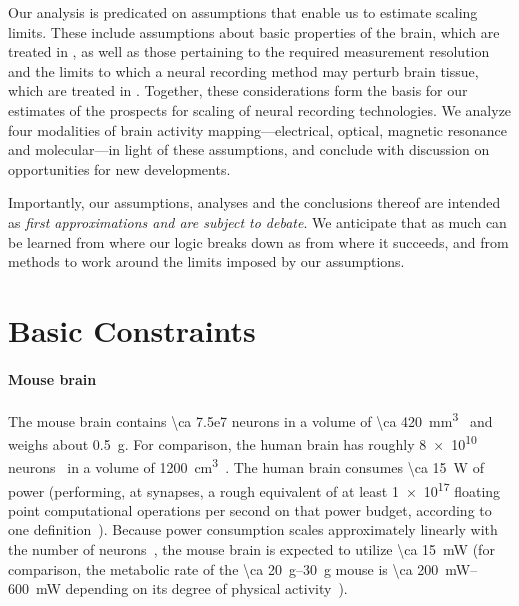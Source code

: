 Our analysis is predicated on assumptions that enable us to estimate scaling limits.
These include assumptions about basic properties of the brain, which are treated in , as well as those pertaining to the required measurement resolution and the limits to which a neural recording method may perturb brain tissue, which are treated in .
Together, these considerations form the basis for our estimates of the prospects for scaling of neural recording technologies.
We analyze four modalities of brain activity mapping---electrical, optical, magnetic resonance and molecular---in light of these assumptions, and conclude with discussion on opportunities for new developments.

Importantly, our assumptions, analyses and the conclusions thereof are intended as \emph{first approximations and are subject to debate}.
We anticipate that as much can be learned from where our logic breaks down as from where it succeeds, and from methods to work around the limits imposed by our assumptions.

\section{Basic Constraints}
\label{sec:constraints}

\paragraph{Mouse brain}
The mouse brain contains \num{\ca 7.5e7} neurons in a volume of \SI{\ca 420}{\milli\meter\cubed}~\cite{vincent10} and weighs about \SI{0.5}{\gram}.
For comparison, the human brain has roughly \num{8e10} neurons~\cite{azevedo09} in a volume of \SI{1200}{\centi\meter\cubed}~\cite{allen02}.
The human brain consumes \SI{\ca 15}{\watt} of power (performing, at synapses, a rough equivalent of at least \num{1e17} floating point computational operations per second on that power budget, according to one definition~\cite{sarpeshkar10}).
Because power consumption scales approximately linearly with the number of neurons~\cite{houzel11}, the mouse brain is expected to utilize \SI{\ca 15}{\milli\watt} (for comparison, the metabolic rate of the \SIrange{\ca 20}{30}{\gram} mouse is \SIrange{\ca 200}{600}{\milli\watt} depending on its degree of physical activity~\cite{speakman13}).

